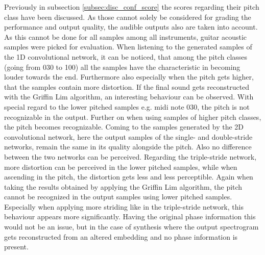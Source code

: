 Previously in subsection \ref{subsec:disc_conf_score} the scores regarding their pitch class have been discussed. As those cannot solely be considered for grading the performance and output quality, the audible outputs also are taken into account. As this cannot be done for all samples among all instruments, guitar acoustic samples were picked for evaluation. When listening to the generated samples of the 1D convolutional network, it can be noticed, that among the pitch classes (going from 030 to 100) all the samples have the characteristic in becoming louder towards the end. Furthermore also especially when the pitch gets higher, that the samples contain more distortion. If the final sound gets reconstructed with the Griffin Lim algorithm, an interesting behaviour can be observed. With special regard to the lower pitched samples e.g. midi note 030, the pitch is not recognizable in the output. Further on when using samples of higher pitch classes, the pitch becomes recognizable. 
Coming to the samples generated by the 2D convolutional network, here the output samples of the single- and double-stride networks, remain the same in its quality alongside the pitch. Also no difference between the two networks can be perceived. Regarding the triple-stride network, more distortion can be perceived in the lower pitched samples, while when ascending in the pitch, the distortion gets less and less perceptible. Again when taking the results obtained by applying the Griffin Lim algorithm, the pitch cannot be recognized in the output samples using lower pitched samples. Especially when applying more striding like in the triple-stride network, this behaviour appears more significantly. Having the original phase information this would not be an issue, but in the case of synthesis where the output spectrogram gets reconstructed from an altered embedding and no phase information is present. 

